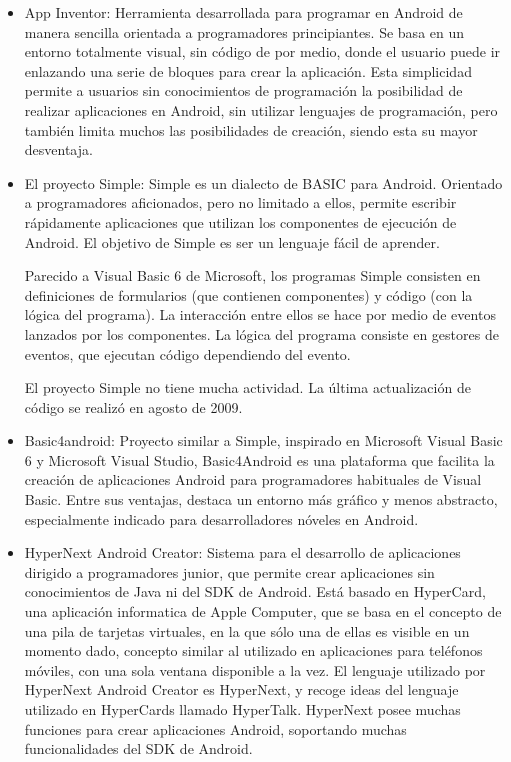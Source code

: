\documentclass[
10pt, %
a4paper, %
oneside, %
headinclude,footinclude, %
BCOR5mm, %
]{scrartcl}
\begin{document}
\begin{itemize}
	\item App Inventor: Herramienta desarrollada para programar en Android de manera sencilla orientada a programadores principiantes. Se basa en un entorno totalmente visual, sin código de por medio, donde el usuario puede ir enlazando una serie de bloques para crear la aplicación. Esta simplicidad permite a usuarios sin conocimientos de programación la posibilidad de realizar aplicaciones en Android, sin utilizar lenguajes de programación, pero también limita muchos las posibilidades de creación, siendo esta su mayor desventaja.

	\item El proyecto Simple: Simple es un dialecto de BASIC para Android. Orientado a programadores aficionados, pero no limitado a ellos, permite escribir rápidamente aplicaciones que utilizan los componentes de ejecución de Android. El objetivo de Simple es ser un lenguaje fácil de aprender.

	Parecido a Visual Basic 6 de Microsoft, los programas Simple consisten en definiciones de formularios (que contienen componentes) y código (con la lógica del programa). La interacción entre ellos se hace por medio de eventos lanzados por los componentes. La lógica del programa consiste en gestores de eventos, que ejecutan código dependiendo del evento.

	El proyecto Simple no tiene mucha actividad. La última actualización de código se realizó en agosto de 2009.

	\item Basic4android: Proyecto similar a Simple, inspirado en Microsoft Visual Basic 6 y Microsoft Visual Studio, Basic4Android es una plataforma que facilita la creación de aplicaciones Android para programadores habituales de Visual Basic. Entre sus ventajas, destaca un entorno más gráfico y menos abstracto, especialmente indicado para desarrolladores nóveles en Android.

	\item HyperNext Android Creator: Sistema para el desarrollo de aplicaciones dirigido a programadores junior, que permite crear aplicaciones sin conocimientos de Java ni del SDK de Android. Está basado en HyperCard, una aplicación informatica de Apple Computer, que se basa en el concepto de una pila de tarjetas virtuales, en la que sólo una de ellas es visible en un momento dado, concepto similar al utilizado en aplicaciones para teléfonos móviles, con una sola ventana disponible a la vez. El lenguaje utilizado por HyperNext Android Creator es HyperNext, y recoge ideas del lenguaje utilizado en HyperCards llamado HyperTalk. HyperNext posee muchas funciones para crear aplicaciones Android, soportando muchas funcionalidades del SDK de Android.


\end{itemize}
\end{document}
